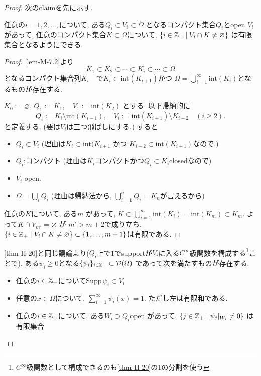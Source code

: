 \begin{proof}
次のclaimを先に示す. 
\begin{tcolorbox}[mybox]
\begin{claim}
任意の$i =1, 2, \ldots, $について, ある\(Q_i \subset V_i \subset \Omega\) 
となるコンパクト集合\(Q_i\)とopen \(V_i\)があって, 任意のコンパクト集合$K \subset \Omega$について, \(\{ i\in \mathbb{Z}_+ \mid V_i \cap K \neq \varnothing \}\) は有限集合となるようにできる. 
\end{claim}
\end{tcolorbox}
\begin{proof}
\ref{lem-M-7.2}より 
\[ K_1 \subset K_2 \subset \cdots \subset K_i \subset \cdots \subset \Omega\]
となるコンパクト集合列$K_i$　で\(K_i \subset \mathrm{int}(K_{i+1})\)かつ \(\Omega = \bigcup_{i=1}^\infty \mathrm{int}(K_i)\)となるものが存在する.

 \(K_0 := \varnothing\), 
\(Q_1 := K_1, \quad V_1 := \mathrm{int}(K_2)\)
とする. 
以下帰納的に
\[
Q_i := K_i \setminus \mathrm{int}(K_{i-1}), \quad V_i := \mathrm{int}(K_{i+1}) \setminus K_{i-2} \quad (i \geq 2).
\]
と定義する. (要は$V_i$は三つ飛ばしにする.)
すると
\begin{itemize}
\item \(Q_i \subset V_i\) (理由は\(K_i \subset \mathrm{int}(K_{i+1}\) かつ \(K_{i-2} \subset \mathrm{int}(K_{i-1})\)なので.)
\item \(Q_i\);コンパクト (理由は\(K_i\)コンパクトかつ\(Q_i \subset K_i\)closedなので)
\item \(V_i\) open. 
\item \(\Omega = \bigcup_i Q_i \)  (理由は帰納法から, $\bigcup_{i=1}^n Q_i = K_n$が言えるから)
\end{itemize}
任意の\(K\)について, ある\(m\) があって, \(K \subset \bigcup_{i=1}^m \mathrm{int}(K_i) = \mathrm{int}(K_m) \subset K_m\).
よって\(K \cap V_{m'} = \varnothing\) が \(m' > m+2\)で成り立ち, 
\(\{ i \in \mathbb{Z}_+ \mid V_i \cap K \neq \varnothing \} \subset \{1, \ldots, m+1\}\)は有限である. 
\end{proof}

\ref{thm-H-20}と同じ議論より($Q_i$上で1でsupportが$V_i$に入る$C^\infty$級関数を構成する\footnote{$C^\infty$級関数として構成できるのも\ref{thm-H-20}の1の分割を使う}ことで), 
ある$\psi_i \ge 0$となる\(\{\psi_i\}_{i \in \mathbb{Z}_+} \subset \mathcal{D}(\Omega)\) であって次を満たすものが存在する. 
\begin{itemize}
\item 任意の$i \in \mathbb{Z}_+$について\(\mathrm{Supp}\,\psi_i \subset V_i\)
\item  任意の$ x \in \Omega$について, \(\sum_{i=1}^\infty \psi_i(x) = 1\). ただし左は有限和である.  
\item 任意の$i \in \mathbb{Z}_+$について, ある\(W_i \supset Q_i\)open があって,  \(\{ j \in \mathbb{Z}_+ \mid \psi_j|_{W_i} \neq 0 \}\) は有限集合
\end{itemize}


\end{proof}
